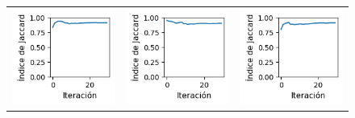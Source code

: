 \begin{figure}[ht]\ContinuedFloat
    \centering
    \begin{tabular}{ccc}

        \includegraphics[width=4.5cm]{../Plots/score_epoch_9.png} &
        \includegraphics[width=4.5cm]{../Plots/score_epoch_10.png} &
        \includegraphics[width=4.5cm]{../Plots/score_epoch_11.png} \\


\end{tabular}
\end{figure}
